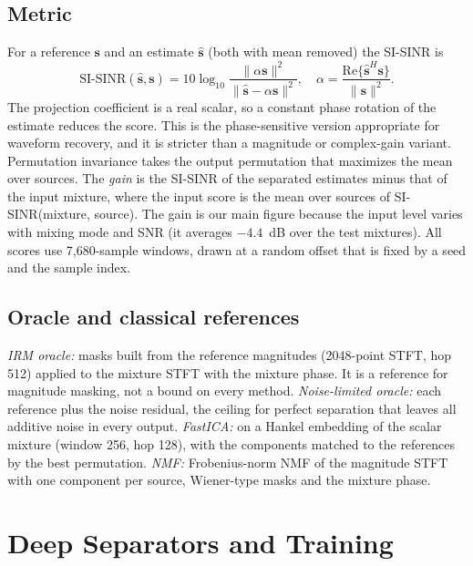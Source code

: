 \documentclass[conference]{IEEEtran}
\begin{document}
\subsection{Metric}

For a reference $\mathbf{s}$ and an estimate $\hat{\mathbf{s}}$ (both with mean removed) the SI-SINR is
\begin{equation}
\text{SI-SINR}(\hat{\mathbf{s}},\mathbf{s}) = 10\log_{10}\frac{\|\alpha\mathbf{s}\|^2}{\|\hat{\mathbf{s}}-\alpha\mathbf{s}\|^2},
\quad \alpha = \frac{\mathrm{Re}\{\hat{\mathbf{s}}^{H}\mathbf{s}\}}{\|\mathbf{s}\|^2}.
\label{eq:sisinr}
\end{equation}
The projection coefficient is a real scalar, so a constant phase rotation of the estimate reduces the score. This is
the phase-sensitive version appropriate for waveform recovery, and it is stricter than a magnitude or complex-gain
variant. Permutation invariance takes the output permutation that maximizes the mean over sources.
The \emph{gain} is the SI-SINR of the separated estimates minus that of the input mixture, where the input score is the mean over sources of
SI-SINR(mixture, source). The gain is our main figure because the input level varies with mixing mode and SNR (it averages
$-4.4$~dB over the test mixtures). All scores use 7,680-sample windows, drawn at a random offset that is fixed by a seed and the sample index.

\subsection{Oracle and classical references}

\emph{IRM oracle:} masks built from the reference magnitudes (2048-point STFT, hop 512) applied to the mixture STFT with the
mixture phase. It is a reference for magnitude masking, not a bound on every method.
\emph{Noise-limited oracle:} each reference plus the noise residual, the ceiling for perfect separation that leaves all additive noise in
every output.
\emph{FastICA:} on a Hankel embedding of the scalar mixture (window 256, hop 128), with the components matched to the references by the best permutation.
\emph{NMF:} Frobenius-norm NMF of the magnitude STFT with one component per source, Wiener-type masks and the mixture phase.

\section{Deep Separators and Training}
\label{sec:methods}
\end{document}
